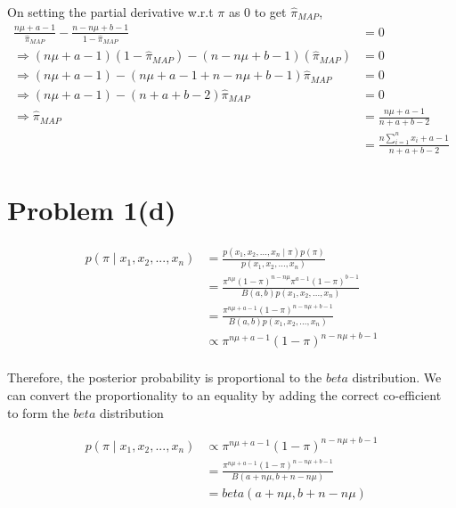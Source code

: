 \documentclass[openany,11pt]{homework}
\begin{document}
On setting the partial derivative w.r.t $\pi$ as 0 to get $\hat{\pi}_{MAP}$,
\begin{align}
\frac{n\mu+a-1}{\hat{\pi}_{MAP}} -\frac{n-n\mu+b-1}{1-\hat{\pi}_{MAP}} & = 0 \\
\Rightarrow (n\mu+a-1)(1-\hat{\pi}_{MAP}) - (n-n\mu+b-1)(\hat{\pi}_{MAP}) & = 0 \\
\Rightarrow (n\mu + a - 1) - (n\mu + a - 1 + n - n\mu + b - 1)\hat{\pi}_{MAP} & = 0 \\
\Rightarrow (n\mu + a - 1) - (n + a + b - 2)\hat{\pi}_{MAP} & = 0 \\
\Rightarrow \hat{\pi}_{MAP} & = \frac{n\mu + a - 1}{n + a + b - 2} \\
							& = \frac{n\sum_{i=1}^{n} x_i + a - 1}{n + a + b - 2}
\end{align}

\section*{Problem 1(d)}

\begin{align}
p(\pi \mid x_1, x_2, ..., x_n) & = \frac{p(x_1, x_2, ..., x_n \mid \pi)p(\pi)}{p(x_1, x_2, ..., x_n)} \\
& = \frac{\pi^{n\mu}(1-\pi)^{n-n\mu}\pi^{a-1}(1-\pi)^{b-1}}{B(a, b)p(x_1, x_2, ..., x_n)} \\
& = \frac{\pi^{n\mu+a-1}(1-\pi)^{n-n\mu+b-1}}{B(a, b)p(x_1, x_2, ..., x_n)} \\
& \propto \pi^{n\mu+a-1}(1-\pi)^{n-n\mu+b-1}				\\
\end{align}

Therefore, the posterior probability is proportional to the $beta$ distribution. We can convert the proportionality to an equality by adding the correct co-efficient to form the $beta$ distribution

\begin{align}
p(\pi \mid x_1, x_2, ..., x_n) & \propto \pi^{n\mu+a-1}(1-\pi)^{n-n\mu+b-1}\\
& = \frac{\pi^{n\mu+a-1}(1-\pi)^{n-n\mu+b-1}}{B(a + n\mu, b + n-n\mu)} \\
& = beta(a + n\mu, b + n-n\mu)
\end{align}
\end{document}
